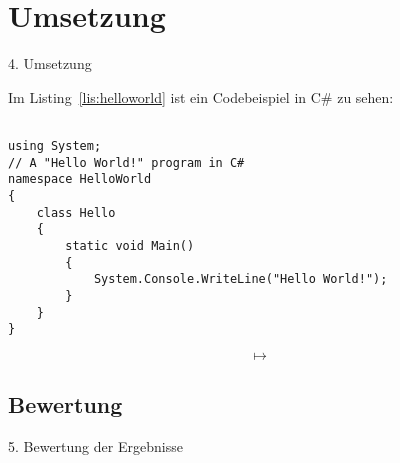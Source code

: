 \chapter{Umsetzung}
\label{sec:Umsetzung}

4. Umsetzung

Im Listing~\ref{lis:helloworld} ist ein Codebeispiel in C\# zu sehen:

\begin{lstlisting}[caption={Codebeispiel C\#},label={lis:helloworld}] 

using System;
// A "Hello World!" program in C#
namespace HelloWorld
{
    class Hello 
    {
        static void Main() 
        {
            System.Console.WriteLine("Hello World!");
        }
    }
}

\end{lstlisting}

	\[\mapsto
\]

%

\section{Bewertung}
\label{sec:Bewertung}

5. Bewertung der Ergebnisse